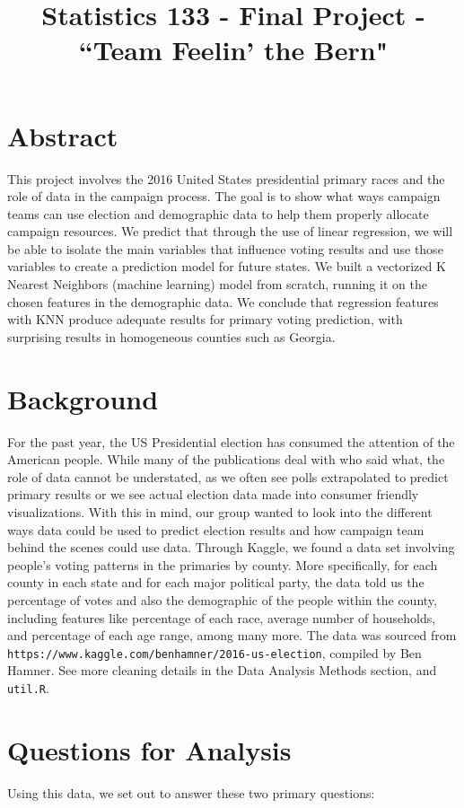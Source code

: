 \documentclass[11pt]{article}
\title{Statistics 133 - Final Project - ``Team Feelin' the Bern"}
\author{\Name}
\date{}
\begin{document}
\maketitle
\tableofcontents
\newpage
\section{Abstract}
This project involves the 2016 United States presidential primary races and the role of data in the campaign process.  The goal is to show what ways campaign teams can use election and demographic data to help them properly allocate campaign resources. We predict that through the use of linear regression, we will be able to isolate the main variables that influence voting results and use those variables to create a prediction model for future states. We built a vectorized K Nearest Neighbors (machine learning) model from scratch, running it on the chosen features in the demographic data. We conclude that regression features with KNN produce adequate results for primary voting prediction, with surprising results in homogeneous counties such as Georgia.  


\section{Background}
For the past year, the US Presidential election has consumed the attention of the American people. While many of the publications deal with who said what, the role of data cannot be understated, as we often see polls extrapolated to predict primary results or we see actual election data made into consumer friendly visualizations. With this in mind, our group wanted to look into the different ways data could be used to predict election results and how campaign team behind the scenes could use data. Through Kaggle, we found a data set involving people’s voting patterns in the primaries by county. More specifically, for each county in each state and for each major political party, the data told us the percentage of votes and also the demographic of the people within the county, including features like percentage of each race, average number of households, and percentage of each age range, among many more. The data was sourced from \texttt{https://www.kaggle.com/benhamner/2016-us-election}, compiled by Ben Hamner. See more cleaning details in the Data Analysis Methods section, and \texttt{util.R}. 

\section{Questions for Analysis}
Using this data, we set out to answer these two primary questions:
\end{document}
